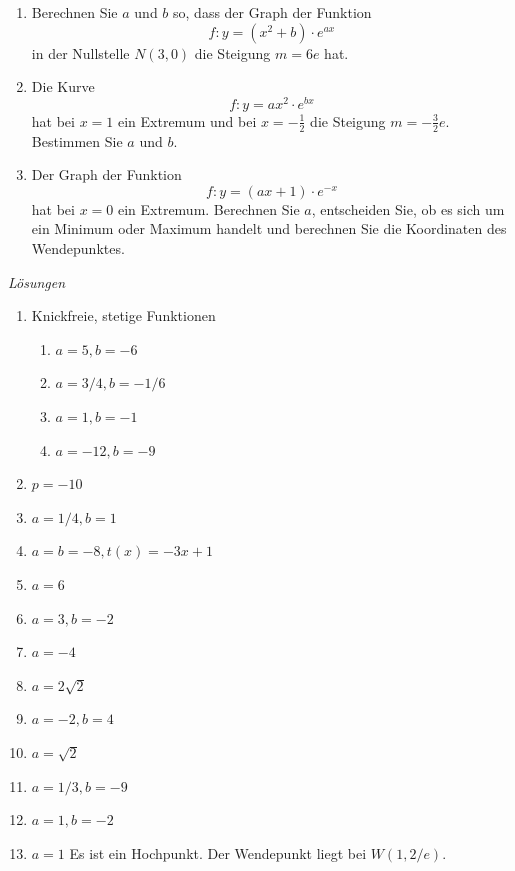 \begin{ueb}
\begin{enumerate}

		\item Berechnen Sie $a$ und $b$ so, dass der Graph der Funktion
		      \[
			      f\colon y=(x^{2}+b)\cdot e^{a x}
		      \]
		      in der Nullstelle $N(3,0)$ die Steigung $m=6 e$ hat.

		\item Die Kurve
		      \[
			      f\colon y=a x^{2}\cdot e^{b x}
		      \]
		      hat bei $x=1$ ein Extremum und bei $x=-\frac{1}{2}$ die Steigung $m=-\frac{3}{2} e$. Bestimmen Sie $a$ und $b$.

		\item Der Graph der Funktion
		      \[
			      f\colon y=(a x+1)\cdot e^{-x}
		      \]
		      hat bei $x=0$ ein Extremum. Berechnen Sie $a$, entscheiden Sie, ob es sich um ein Minimum oder Maximum handelt und berechnen Sie die Koordinaten des Wendepunktes.


	\end{enumerate}
\end{ueb}
\clearpage
\emph{Lösungen}
\begin{enumerate}
	\item Knickfreie, stetige Funktionen
	      \begin{enumerate}
		      \item $a=5, b=-6$
		      \item $a=3/4, b= -1/6$
		      \item $a=1, b=-1$
		      \item $a=-12, b= -9$
	      \end{enumerate}
	\item $p=-10$
	\item $a=1/4, b=1$
	\item $a=b=-8, t(x)=-3x+1$
	\item $a=6$
	\item $a=3, b=-2$
	\item $a=-4$
	\item $a=2\sqrt{2}$
	\item $a=-2, b=4$
	\item $a= \sqrt{2}$

	\item $a=1/3, b=-9$
	\item $a=1, b= -2$
	\item $a=1$ Es ist ein Hochpunkt. Der Wendepunkt liegt bei $W(1, 2/e)$.

\end{enumerate}